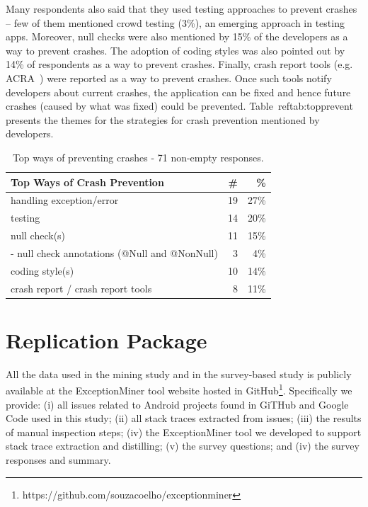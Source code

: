 Many respondents also said that they used testing approaches to prevent crashes -- few of them mentioned crowd testing (3\%), an emerging approach in testing apps. Moreover, null checks were also mentioned by 15\% of the developers as a way to prevent crashes. 
The adoption of coding styles was also pointed out by 14\% of respondents as a way to prevent crashes. Finally, crash report tools (e.g. ACRA~\cite{Acra14}) were reported as a way to prevent crashes. Once such tools notify developers about current crashes, the application can be fixed and hence future crashes (caused by what was fixed) could be prevented. Table~ref{tab:topprevent} presents the themes for the strategies for crash prevention mentioned by developers.	 					
		
\bigskip 


\bigskip 
				
\begin{table}
\scriptsize
\centering
\begin{tabular}{lrr}
\hline
\bfseries{Top Ways of Crash Prevention} & \bfseries{\#} & \bfseries{\%} \\
\hline
handling exception/error  & 19 &	27\% \\
testing &	14 &	20\% \\
null check(s) &	11 &	15\% \\
- null check annotations (@Null and @NonNull)	& 3 & 	4\% \\
coding style(s)	& 10 &	14\% \\
crash report / crash report tools &	8	& 11\% \\
\hline
\end{tabular}
\caption{Top ways of preventing crashes - 71 non-empty responses. }
\label{tab:topprevent}
\end{table}

\bigskip 


\section{Replication Package}
All the data used in the mining study and in the survey-based study is publicly available at the ExceptionMiner tool website hosted in GitHub\footnote{ https://github.com/souzacoelho/exceptionminer}.
Specifically we provide: (i) all issues related to Android projects found
in GiTHub and Google Code used in this study; (ii) all stack traces extracted
from issues; (iii) the results of manual inspection steps; (iv) the
ExceptionMiner tool we developed to support stack trace extraction and distilling; (v) the survey questions; and (iv) the survey responses and summary.


